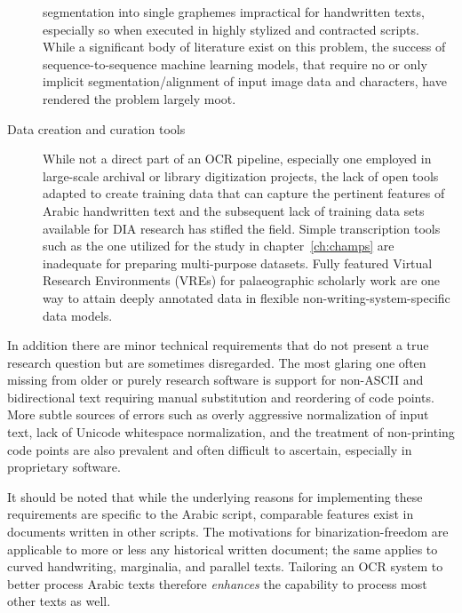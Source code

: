 \begin{description}
		segmentation into single graphemes impractical for handwritten
		texts, especially so when executed in highly stylized and
		contracted scripts. While a significant body of literature
		exist on this problem, the success of sequence-to-sequence
		machine learning models, that require no or only implicit
		segmentation/alignment of input image data and characters, have
		rendered the problem largely moot.
	\item[Data creation and curation tools] While not a direct part of an
		OCR pipeline, especially one employed in large-scale archival
		or library digitization projects, the lack of open tools
		adapted to create training data that can capture the pertinent
		features of Arabic handwritten text and the subsequent lack of
		training data sets available for DIA research has stifled the
		field. Simple transcription tools such as the one utilized for
		the study in chapter~\ref{ch:champs} are inadequate for
		preparing multi-purpose datasets. Fully featured Virtual
		Research Environments (VREs) for palaeographic scholarly work
		are one way to attain deeply annotated data in flexible
		non-writing-system-specific data models.
\end{description}

In addition there are minor technical requirements that do not present a true
research question but are sometimes disregarded. The most glaring one often
missing from older or purely research software is support for non-ASCII and
bidirectional text requiring manual substitution and reordering of code points.
More subtle sources of errors such as overly aggressive normalization of input
text, lack of Unicode whitespace normalization, and the treatment of
non-printing code points are also prevalent and often difficult to ascertain,
especially in proprietary software. 

It should be noted that while the underlying reasons for implementing these
requirements are specific to the Arabic script, comparable features exist in
documents written in other scripts. The motivations for binarization-freedom
are applicable to more or less any historical written document; the same
applies to curved handwriting, marginalia, and parallel texts. Tailoring an OCR
system to better process Arabic texts therefore \emph{enhances} the capability
to process most other texts as well.

\printbibliography[heading=subbibliography]
\endrefsection
